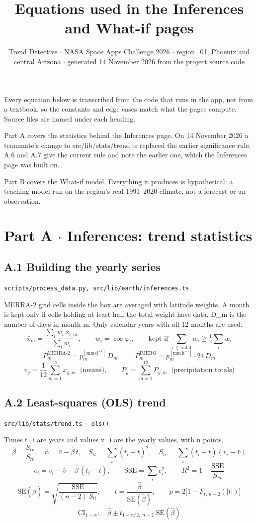 \documentclass[10pt,a4paper]{article}
\title{Equations used in the Inferences and What-if pages}
\author{Trend Detective $\cdot$ NASA Space Apps Challenge 2026 $\cdot$ region\_01, Phoenix and central Arizona $\cdot$ generated 14 November 2026 from the project source code}
\date{}
\begin{document}
\maketitle
Every equation below is transcribed from the code that runs in the app, not from a textbook, so the constants and edge cases match what the pages compute. Source files are named under each heading.

Part A covers the statistics behind the Inferences page. On 14 November 2026 a teammate's change to src/lib/stats/trend.ts replaced the earlier significance rule. A.6 and A.7 give the current rule and note the earlier one, which the Inferences page was built on.

Part B covers the What-if model. Everything it produces is hypothetical: a teaching model run on the region's real 1991--2020 climate, not a forecast or an observation.

\section*{Part A $\cdot$ Inferences: trend statistics}

\subsection*{A.1 Building the yearly series}
{\footnotesize\texttt{scripts/process\_data.py, src/lib/earth/inferences.ts}}

MERRA-2 grid cells inside the box are averaged with latitude weights. A month is kept only if cells holding at least half the total weight have data. D\_m is the number of days in month m. Only calendar years with all 12 months are used.
\[
\bar{x}_m = \frac{\sum_i w_i\, x_{i,m}}{\sum_i w_i}, \qquad w_i = \cos\varphi_i, \qquad \text{kept if } \sum_{i\,\in\,\text{valid}} w_i \ge \tfrac12 \sum_i w_i
\]
\[
P_m^{\text{MERRA-2}} = p_m^{[\mathrm{mm\,d^{-1}}]}\, D_m, \qquad P_m^{\text{IMERG}} = p_m^{[\mathrm{mm\,h^{-1}}]}\cdot 24\, D_m
\]
\[
v_y = \frac{1}{12}\sum_{m=1}^{12} x_{y,m} \;\;\text{(means)}, \qquad P_y = \sum_{m=1}^{12} P_{y,m} \;\;\text{(precipitation totals)}
\]

\subsection*{A.2 Least-squares (OLS) trend}
{\footnotesize\texttt{src/lib/stats/trend.ts $\cdot$ ols()}}

Times t\_i are years and values v\_i are the yearly values, with n points.
\[
\hat\beta = \frac{S_{tv}}{S_{tt}}, \quad \hat\alpha = \bar v - \hat\beta\,\bar t, \quad S_{tt} = \sum_i (t_i-\bar t)^2, \quad S_{tv} = \sum_i (t_i-\bar t)(v_i-\bar v)
\]
\[
e_i = v_i - \bar v - \hat\beta\,(t_i - \bar t), \qquad \mathrm{SSE} = \sum_i e_i^2, \qquad R^2 = 1 - \frac{\mathrm{SSE}}{S_{vv}}
\]
\[
\mathrm{SE}(\hat\beta) = \sqrt{\frac{\mathrm{SSE}}{(n-2)\,S_{tt}}}, \qquad t = \frac{\hat\beta}{\mathrm{SE}(\hat\beta)}, \qquad p = 2\bigl[1 - F_{t,\,n-2}(|t|)\bigr]
\]
\[
\text{CI}_{1-\alpha}:\quad \hat\beta \pm t_{1-\alpha/2,\;n-2}\;\mathrm{SE}(\hat\beta)
\]
\end{document}
